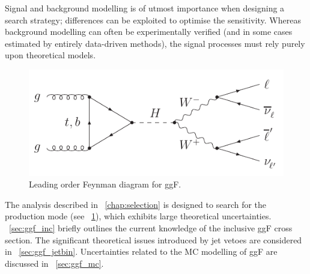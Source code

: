 
Signal and background modelling is of utmost importance when designing a search strategy; 
differences can be exploited to optimise the sensitivity. Whereas background modelling can 
often be experimentally verified (and in some cases estimated by entirely data-driven 
methods), the signal processes must rely purely upon theoretical models.

\begin{figure}[b]
	\includegraphics[width=\mediumfigwidth]{axodraw/ggf_WWlvlv.pdf}
	\caption{Leading order Feynman diagram for \acf{ggF}.}
	\label{fig:sig:ggF}
\end{figure}

The analysis described in \Chapter~\ref{chap:selection} is designed to search for the 
 production mode (see \Figure~\ref{fig:sig:ggF}), which exhibits large 
theoretical uncertainties. \Section~\ref{sec:ggf_inc} briefly outlines the current 
knowledge of the inclusive \ac{ggF} cross section. The significant theoretical issues 
introduced by jet vetoes are considered in \Section~\ref{sec:ggf_jetbin}. Uncertainties 
related to the MC modelling of \ac{ggF} are discussed in \Section~\ref{sec:ggf_mc}.

